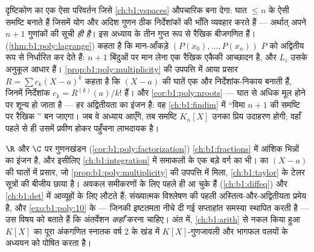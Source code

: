 \begin{remark}[मध्यांतर: बहुपद सदिश भी हैं]\label{rem:b1:poly:interlude}
दृष्टिकोण का एक ऐसा परिवर्तन जिसे \cref{ch:b1:vspaces} औपचारिक बना देगा: घात
$\leq n$ के  ऐसी समष्टि बनाते हैं जिसमें योग और अदिश गुणन ठीक
निर्देशांकों की भाँति व्यवहार करते हैं --- अर्थात्  अपने $n + 1$
गुणांकों की सूची \emph{ही है}। इस अध्याय के तीन  गुप्त रूप से रैखिक
बीजगणित हैं।  (\cref{thm:b1:poly:lagrange}) कहता है कि
मान-आँकड़े $(P(x_0), \dots, P(x_n))$ $P$ को अद्वितीय रूप से निर्धारित कर
देते हैं: $n + 1$ बिंदुओं पर मान लेना एक रैखिक एकैकी आच्छादन है, और $L_i$
उसके अनुकूल आधार हैं। \cref{prop:b1:poly:multiplicity} की उपपत्ति में आया
प्रसार $R = \sum c_k(X - a)^k$ कहता है कि $(X - a)$ की घातें एक और
निर्देशांक-निकाय बनाती हैं, जिनमें निर्देशांक $c_k = R^{(k)}(a)/k!$ हैं। और
\cref{cor:b1:poly:nroots} --- घात से अधिक मूल होने पर  शून्य हो जाता है
--- हर अद्वितीयता का इंजन है: वह \cref{ch:b1:findim} में ``विमा $n + 1$ की
समष्टि पर  रैखिक '' बन जाएगा। जब वे अध्याय आएँगे, तब समष्टि
$K_n[X]$ उनका प्रिय उदाहरण होगी; वहाँ पहले से ही उसमें प्रवीण होकर पहुँचना
लाभदायक है।
\end{remark}

\begin{remark}[यह अध्याय कहाँ काम आता है]\label{rem:b1:poly:whereused}
$\R$ और $\C$ पर गुणनखंडन (\cref{cor:b1:poly:factorization})
\cref{ch:b1:fractions} में आंशिक भिन्नों का इंजन है, और इसीलिए
\cref{ch:b1:integration} में समाकलों के एक बड़े वर्ग का भी।  का $(X -
a)$ की घातों में प्रसार, जो \cref{prop:b1:poly:multiplicity} की उपपत्ति में
मिला, \cref{ch:b1:taylor} के टेलर सूत्रों की बीजीय छाया है। 
अवकल समीकरणों के लिए पहले ही आ चुके हैं (\cref{ch:b1:diffeq}) और
\cref{ch:b1:det} में आव्यूहों के लिए लौटते हैं; 
संख्यात्मक विश्लेषण की पहली अस्तित्व-और-अद्वितीयता प्रमेय है, और
\cref{exo:b1:poly:10} के  --- जिनकी इष्टतमता नीचे दी गई
सप्ताहांत समस्या स्थापित करती है --- उस विषय को बताते हैं कि अंतर्वेशन
\emph{कहाँ} करना चाहिए। अंत में, \cref{ch:b1:arith} से नकल किया हुआ $K[X]$
का पूरा अंकगणित स्नातक वर्ष 2 के खंड में $K[X]$-गुणजावली और भागफल वलयों के
अध्ययन को पोषित करता है।
\end{remark}

